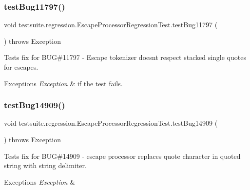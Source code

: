 \subsubsection{\texorpdfstring{test\+Bug11797()}{testBug11797()}}
{\footnotesize\ttfamily void testsuite.\+regression.\+Escape\+Processor\+Regression\+Test.\+test\+Bug11797 (\begin{DoxyParamCaption}{ }\end{DoxyParamCaption}) throws Exception}

Tests fix for B\+UG\#11797 -\/ Escape tokenizer doesn\textquotesingle{}t respect stacked single quotes for escapes.


\begin{DoxyExceptions}{Exceptions}
{\em Exception} & if the test fails. \\
\hline
\end{DoxyExceptions}
\mbox{\label{classtestsuite_1_1regression_1_1_escape_processor_regression_test_ae70f225ac0aefbe783d3f4a137c0b66d}} 
\subsubsection{\texorpdfstring{test\+Bug14909()}{testBug14909()}}
{\footnotesize\ttfamily void testsuite.\+regression.\+Escape\+Processor\+Regression\+Test.\+test\+Bug14909 (\begin{DoxyParamCaption}{ }\end{DoxyParamCaption}) throws Exception}

Tests fix for B\+UG\#14909 -\/ escape processor replaces quote character in quoted string with string delimiter.


\begin{DoxyExceptions}{Exceptions}
{\em Exception} & \\
\hline
\end{DoxyExceptions}
\mbox{\label{classtestsuite_1_1regression_1_1_escape_processor_regression_test_a807fc950104890375b5291b116c9c45a}} 
